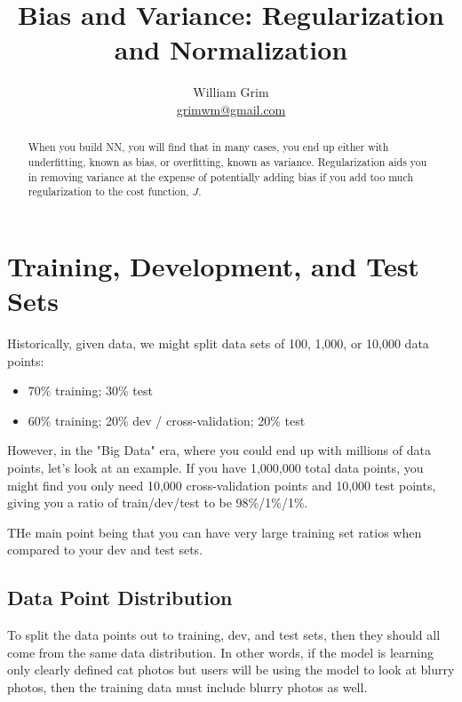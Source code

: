 \documentclass{article}
\begin{document}
\title {Bias and Variance: Regularization and Normalization}
\author{William Grim \\ \href{mailto:grimwm@gmail.com}{grimwm@gmail.com}}

\maketitle

\begin{abstract}
When you build NN, you will find that in many cases, you end up either with underfitting, known as bias, or overfitting, known as variance.  Regularization aids you in removing variance at the expense of potentially adding bias if you add too much regularization to the cost function, $J$.
\end{abstract}

\section{Training, Development, and Test Sets}

Historically, given data, we might split data sets of 100, 1,000, or 10,000 data points:

\begin{itemize}
\item 70\% training; 30\% test
\item 60\% training; 20\% dev / cross-validation; 20\% test
\end{itemize}

However, in the "Big Data" era, where you could end up with millions of data points, let's look at an example.  If you have 1,000,000 total data points, you might find you only need 10,000 cross-validation points and 10,000 test points, giving you a ratio of train/dev/test to be 98\%/1\%/1\%.

THe main point being that you can have very large training set ratios when compared to your dev and test sets.

\subsection{Data Point Distribution}

To split the data points out to training, dev, and test sets, then they should all come from the same data distribution.  In other words, if the model is learning only clearly defined cat photos but users will be using the model to look at blurry photos, then the training data must include blurry photos as well.
\end{document}
